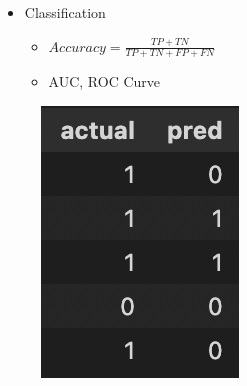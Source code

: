 \begin{frame}
   \vspace{.5cm}
   \begin{minipage}{0.58\linewidth}
      \begin{itemize}
         \item Classification      
         \begin{itemize}
            \item $Accuracy = \frac{TP + TN}{TP + TN + FP + FN}$
            \vspace{.2cm}
            \item AUC, ROC Curve
         \end{itemize}
      \end{itemize}
   \end{minipage}
   \begin{minipage}{0.38\linewidth}
      \begin{figure}[H]
         \includegraphics[scale=.37]{../images/illustrations/model_results_classification.png}
      \end{figure}
   \end{minipage}


\end{frame}
